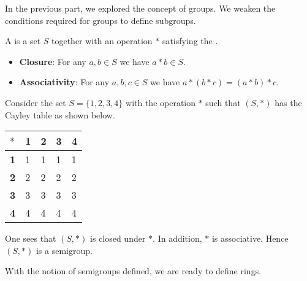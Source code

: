 In the previous part, we explored the concept of groups. We weaken the conditions required for groups to define subgroups.
\begin{definition}
    A  is a set $S$ together with an operation $\ast$ satisfying the .
    \begin{itemize}
        \item \textbf{Closure}: For any $a, b \in S$ we have $a\ast b \in S$.
        \item \textbf{Associativity}: For any $a, b, c \in S$ we have $a \ast (b \ast c) = (a \ast b) \ast c$.
    \end{itemize}
\end{definition}
\begin{example}
    Consider the set $S = \{1, 2, 3, 4\}$ with the operation $\ast$ such that $(S, \ast)$ has the Cayley table as shown below.
    \begin{table}[h]
        \centering
        \begin{tabular}{|l|l|l|l|l|}
            \hline
            $\ast$     & \textbf{1} & \textbf{2} & \textbf{3} & \textbf{4} \\ \hline
            \textbf{1} & 1          & 1          & 1          & 1          \\ \hline
            \textbf{2} & 2          & 2          & 2          & 2          \\ \hline
            \textbf{3} & 3          & 3          & 3          & 3          \\ \hline
            \textbf{4} & 4          & 4          & 4          & 4          \\ \hline
        \end{tabular}
    \end{table}

    One sees that $(S, \ast)$ is closed under $\ast$. In addition, $\ast$ is associative. Hence $(S, \ast)$ is a semigroup.
\end{example}

With the notion of semigroups defined, we are ready to define rings.

